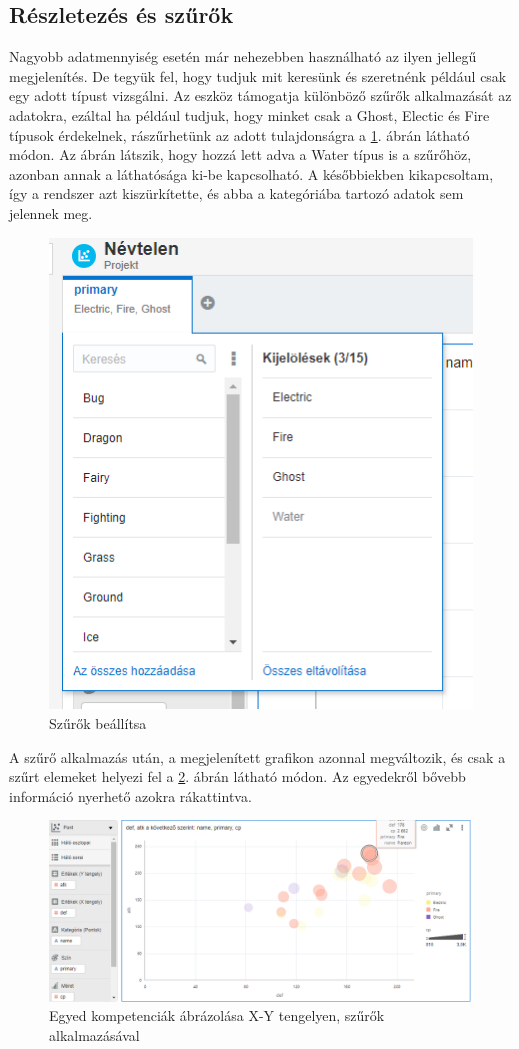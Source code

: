 	\subsection{Részletezés és szűrők}
	Nagyobb adatmennyiség esetén már nehezebben használható az ilyen jellegű megjelenítés. De tegyük fel, hogy tudjuk mit keresünk és szeretnénk például csak egy adott típust vizsgálni. Az eszköz támogatja különböző szűrők alkalmazását az adatokra, ezáltal ha például tudjuk, hogy minket csak a Ghost, Electic és Fire típusok érdekelnek, rászűrhetünk az adott tulajdonságra a \ref{fig:pokedatafilter}. ábrán látható módon. Az ábrán látszik, hogy hozzá lett adva a Water típus is a szűrőhöz, azonban annak a láthatósága ki-be kapcsolható. A későbbiekben kikapcsoltam, így a rendszer azt kiszürkítette, és abba a kategóriába tartozó adatok sem jelennek meg.
	\begin{figure}[h!]
		\centering
		\includegraphics[width=0.5\linewidth]{dani_imgs/poke_data_filter}
		\caption{Szűrők beállítsa}
		\label{fig:pokedatafilter}
	\end{figure}
	A szűrő alkalmazás után, a megjelenített grafikon azonnal megváltozik, és csak a szűrt elemeket helyezi fel a \ref{fig:pokedatafilterresult}. ábrán látható módon. Az egyedekről bővebb információ nyerhető azokra rákattintva.
	\begin{figure}[h!]
		\centering
		\includegraphics[width=0.85\linewidth]{dani_imgs/poke_data_filter_result}
		\caption{Egyed kompetenciák ábrázolása X-Y tengelyen, szűrők alkalmazásával}
		\label{fig:pokedatafilterresult}
	\end{figure}

